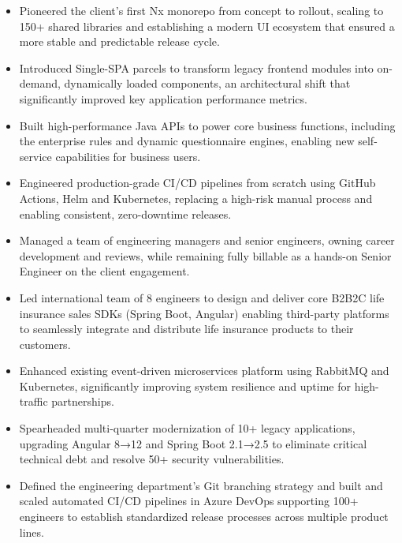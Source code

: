 \begin{itemize}[leftmargin=*, itemsep=\bulletItemSeparation, topsep=0pt]
    \item Pioneered the client's first Nx monorepo from concept to rollout, scaling to 150+ shared libraries and establishing a modern UI ecosystem that ensured a more stable and predictable release cycle.
    \item Introduced Single-SPA parcels to transform legacy frontend modules into on-demand, dynamically loaded components, an architectural shift that significantly improved key application performance metrics.
    \item Built high-performance Java APIs to power core business functions, including the enterprise rules and dynamic questionnaire engines, enabling new self-service capabilities for business users.
    \item Engineered production-grade CI/CD pipelines from scratch using GitHub Actions, Helm and Kubernetes, replacing a high-risk manual process and enabling consistent, zero-downtime releases.
    \item Managed a team of engineering managers and senior engineers, owning career development and reviews, while remaining fully billable as a hands-on Senior Engineer on the client engagement.
\end{itemize}
\vspace{\spacingBetweenJobs}

\begin{itemize}[leftmargin=*, itemsep=\bulletItemSeparation, topsep=0pt]
    \item Led international team of 8 engineers to design and deliver core B2B2C life insurance sales SDKs (Spring Boot, Angular) enabling third-party platforms to seamlessly integrate and distribute life insurance products to their customers.
    \item Enhanced existing event-driven microservices platform using RabbitMQ and Kubernetes, significantly improving system resilience and uptime for high-traffic partnerships.
    \item Spearheaded multi-quarter modernization of 10+ legacy applications, upgrading Angular 8→12 and Spring Boot 2.1→2.5 to eliminate critical technical debt and resolve 50+ security vulnerabilities.
    \item Defined the engineering department's Git branching strategy and built and scaled automated CI/CD pipelines in Azure DevOps supporting 100+ engineers to establish standardized release processes across multiple product lines.
\end{itemize}
\vspace{\spacingBetweenJobs}

